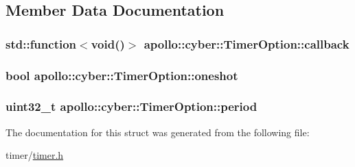 \subsection{Member Data Documentation}
\hypertarget{structapollo_1_1cyber_1_1TimerOption_af36f1413cc8bc74335906347c90d22f3}{
\subsubsection[{callback}]{\setlength{\rightskip}{0pt plus 5cm}std\-::function$<$void()$>$ apollo\-::cyber\-::\-Timer\-Option\-::callback}}\label{structapollo_1_1cyber_1_1TimerOption_af36f1413cc8bc74335906347c90d22f3}
\hypertarget{structapollo_1_1cyber_1_1TimerOption_abbadf97fc595abb13d5a8eccb6151487}{
\subsubsection[{oneshot}]{\setlength{\rightskip}{0pt plus 5cm}bool apollo\-::cyber\-::\-Timer\-Option\-::oneshot}}\label{structapollo_1_1cyber_1_1TimerOption_abbadf97fc595abb13d5a8eccb6151487}
\hypertarget{structapollo_1_1cyber_1_1TimerOption_a1396276508eb65076ffad3b8490118e8}{
\subsubsection[{period}]{\setlength{\rightskip}{0pt plus 5cm}uint32\-\_\-t apollo\-::cyber\-::\-Timer\-Option\-::period}}\label{structapollo_1_1cyber_1_1TimerOption_a1396276508eb65076ffad3b8490118e8}


The documentation for this struct was generated from the following file\-:\begin{DoxyCompactItemize}
\item 
timer/\hyperlink{timer_8h}{timer.\-h}\end{DoxyCompactItemize}
